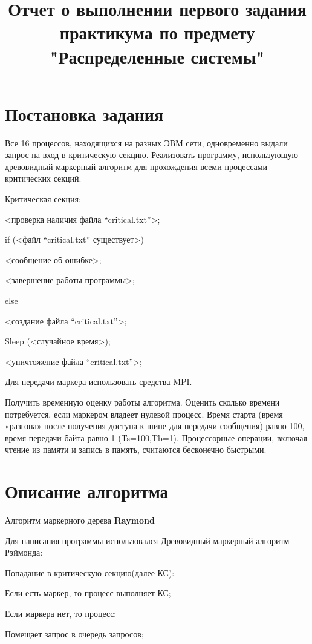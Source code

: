 \documentclass[12pt, oneside, a4paper]{article}
\begin{document}
\title{Отчет о выполнении первого задания практикума по предмету "Распределенные системы"}

\section{Постановка задания}

Все 16 процессов, находящихся на разных ЭВМ сети, одновременно выдали запрос на вход в критическую секцию. Реализовать программу, использующую древовидный маркерный алгоритм для прохождения всеми процессами критических секций.


Критическая секция:

<проверка наличия файла “critical.txt”>;

if (<файл “critical.txt” существует>) {

<сообщение об ошибке>;

<завершение работы программы>;

} else {

<создание файла “critical.txt”>;

Sleep (<случайное время>);

<уничтожение файла “critical.txt”>;

}


Для передачи маркера использовать средства MPI.


Получить временную оценку работы алгоритма. Оценить сколько времени потребуется, если маркером владеет нулевой процесс. Время старта (время «разгона» после получения доступа к шине для передачи сообщения) равно 100, время передачи байта равно 1 (Ts=100,Tb=1). Процессорные операции, включая чтение из памяти и запись в память, считаются бесконечно быстрыми.

\section{Описание алгоритма}

Алгоритм маркерного дерева \textbf{Raymond}

Для написания программы использовался Древовидный маркерный алгоритм Рэймонда:

Попадание в критическую секцию(далее КС):

Если есть маркер, то процесс выполняет КС;

Если маркера нет, то процесс:

Помещает запрос в очередь запросов;
\end{document}
